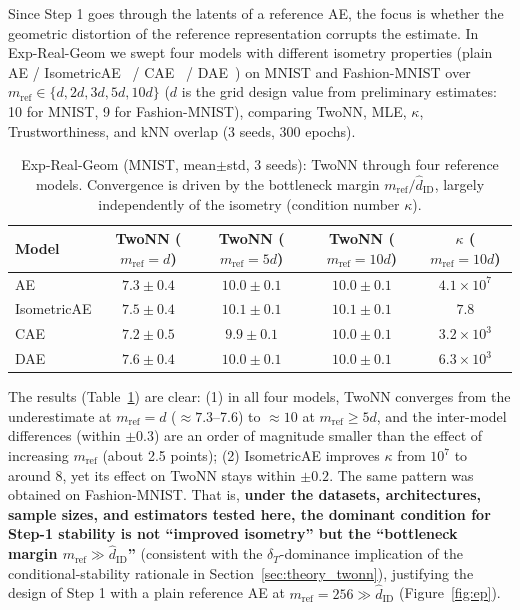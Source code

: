\documentclass[make,article,submit,pdftex,moreauthors]{Definitions/mdpi}
\newcommand{\hatdID}{\hat{d}_{\mathrm{ID}}}
\newcommand{\kap}{\kappa}
\begin{document}
Since Step 1 goes through the latents of a reference AE, the focus is
whether the geometric distortion of the reference representation corrupts
the estimate.
In Exp-Real-Geom we swept four models with different isometry properties
(plain AE / IsometricAE~\cite{kato2020rdae} / CAE~\cite{rifai2011cae} /
DAE~\cite{alain2014dae}) on MNIST and Fashion-MNIST over
$m_{\mathrm{ref}} \in \{d, 2d, 3d, 5d, 10d\}$
($d$ is the grid design value from preliminary estimates: 10 for MNIST,
9 for Fashion-MNIST), comparing TwoNN, MLE,
$\kap$, Trustworthiness, and kNN overlap (3 seeds, 300 epochs).

\begin{table}[H]
\caption{Exp-Real-Geom (MNIST, mean$\pm$std, 3 seeds): TwoNN through four
reference models. Convergence is driven by the bottleneck margin
$m_{\mathrm{ref}} / \hatdID$, largely independently of the isometry
(condition number $\kap$).}
\label{tab:real_geom}
\footnotesize
\begin{tabular}{lcccc}
\toprule
\textbf{Model} & \textbf{TwoNN ($m_{\mathrm{ref}} = d$)} & \textbf{TwoNN ($m_{\mathrm{ref}} = 5d$)} & \textbf{TwoNN ($m_{\mathrm{ref}} = 10d$)} & $\kap$ \textbf{($m_{\mathrm{ref}} = 10d$)} \\
\midrule
AE          & $7.3 \pm 0.4$ & $10.0 \pm 0.1$ & $10.0 \pm 0.1$ & $4.1 \times 10^{7}$ \\
IsometricAE & $7.5 \pm 0.4$ & $10.1 \pm 0.1$ & $10.1 \pm 0.1$ & $7.8$ \\
CAE         & $7.2 \pm 0.5$ & $9.9 \pm 0.1$  & $10.0 \pm 0.1$ & $3.2 \times 10^{3}$ \\
DAE         & $7.6 \pm 0.4$ & $10.0 \pm 0.1$ & $10.0 \pm 0.1$ & $6.3 \times 10^{3}$ \\
\bottomrule
\end{tabular}
\end{table}

The results (Table~\ref{tab:real_geom}) are clear:
(1) in all four models, TwoNN converges from the underestimate at
$m_{\mathrm{ref}} = d$ ($\approx 7.3$--7.6) to $\approx 10$ at
$m_{\mathrm{ref}} \geq 5d$, and the inter-model differences (within
$\pm 0.3$) are an order of magnitude smaller than the effect of increasing
$m_{\mathrm{ref}}$ (about 2.5 points);
(2) IsometricAE improves $\kap$ from $10^{7}$ to around $8$, yet its effect
on TwoNN stays within $\pm 0.2$.
The same pattern was obtained on Fashion-MNIST.
That is, \textbf{under the datasets, architectures, sample sizes, and
estimators tested here, the dominant condition for Step-1 stability is not
``improved isometry'' but the ``bottleneck margin
$m_{\mathrm{ref}} \gg \hatdID$''} (consistent with the $\delta_T$-dominance
implication of the conditional-stability rationale in
Section~\ref{sec:theory_twonn}), justifying the design
of Step 1 with a plain reference AE at $m_{\mathrm{ref}} = 256 \gg \hatdID$
(Figure~\ref{fig:ep}).
\end{document}
